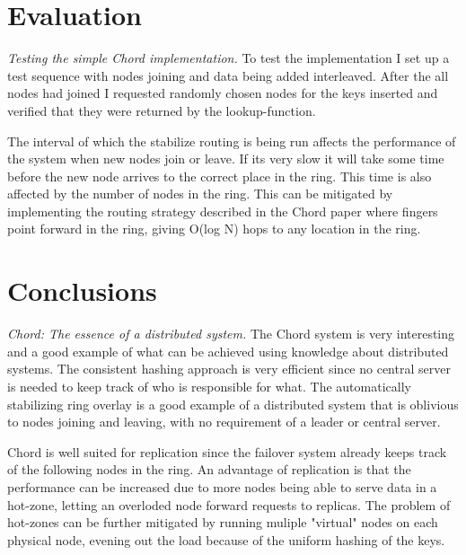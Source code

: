 \documentclass[a4paper, 11pt]{article}
\begin{document}
\section{Evaluation}

\textit{Testing the simple Chord implementation.}
To test the implementation I set up a test sequence with nodes joining and data being added interleaved. After the all nodes had joined I
requested randomly chosen nodes for the keys inserted and verified that they were returned by the lookup-function.
\par
The interval of which the stabilize routing is being run affects the performance of the system when new nodes join or leave. If its very slow it
will take some time before the new node arrives to the correct place in the ring. This time is also affected by the number of nodes in the ring.
This can be mitigated by implementing the routing strategy described in the Chord paper where fingers point forward in the ring, giving O(log N) hops
to any location in the ring.

\section{Conclusions}

\textit{Chord: The essence of a distributed system.}
The Chord system is very interesting and a good example of what can be achieved using knowledge about distributed systems. The consistent hashing
approach is very efficient since no central server is needed to keep track of who is responsible for what. The automatically stabilizing ring
overlay is a good example of a distributed system that is oblivious to nodes joining and leaving, with no requirement of a leader or central server.
\par
Chord is well suited for replication since the failover system already keeps track of the following nodes in the ring. An advantage of replication
is that the performance can be increased due to more nodes being able to serve data in a hot-zone, letting an overloded node forward requests to
replicas. The problem of hot-zones can be further mitigated by running muliple "virtual" nodes on each physical node, evening out the load because
of the uniform hashing of the keys.
\end{document}
